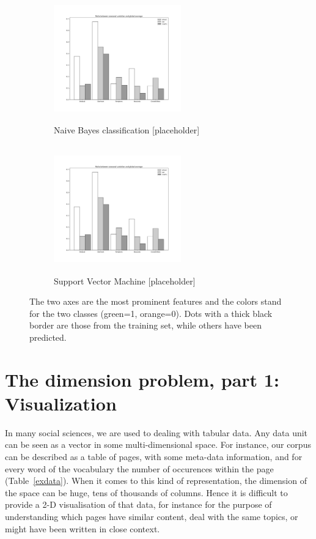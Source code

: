 \documentclass[a4paper,11pt]{article}
\begin{document}
\begin{figure}
	\begin{subfigure}{0.5\textwidth}
		\includegraphics[width=5.5cm, height=5.5cm, keepaspectratio]{./img/placeholder}
		\caption{Naive Bayes classification [placeholder]}
	\end{subfigure}
	\begin{subfigure}{0.5\textwidth}
		\includegraphics[width=5.5cm, height=5.5cm, keepaspectratio]{./img/placeholder}
		\caption{Support Vector Machine [placeholder]}
	\end{subfigure}
\caption{The two axes are the most prominent features and the colors stand for the two classes (green=1, orange=0). Dots with a thick black border are those from the training set, while others have been predicted.}
\label{fig:svm_bn}
\end{figure}


\section{The dimension problem, part 1:  Visualization}

In many social sciences, we are used to dealing with tabular data. Any data unit can be seen as a vector in some multi-dimensional space. For instance, our corpus can be described as a table of pages, with some meta-data information, and for every word of the vocabulary the number of occurences within the page (Table~\ref{exdata}). When it comes to this kind of representation, the dimension of the space can be huge, tens of thousands of columns. Hence it is difficult to provide a 2-D visualisation of that data, for instance for the purpose of understanding which pages have similar content, deal with the same topics, or might have been written in close context. 
\end{document}
